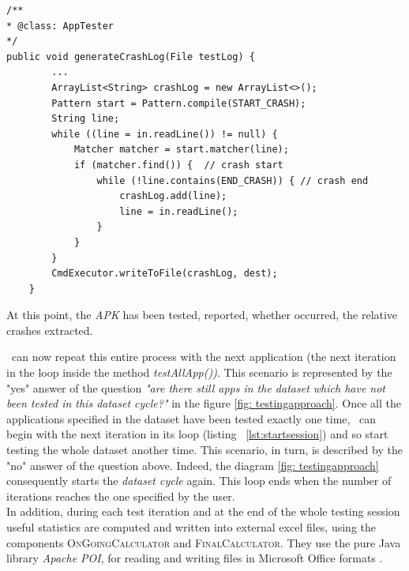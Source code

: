 \begin{lstlisting}[caption=\AppTester's method for extracting a crash log from its test log,label={lst:generatecrash}]
/**
* @class: AppTester
*/
public void generateCrashLog(File testLog) {
        ...
        ArrayList<String> crashLog = new ArrayList<>();
        Pattern start = Pattern.compile(START_CRASH);
        String line;
        while ((line = in.readLine()) != null) {
            Matcher matcher = start.matcher(line);
            if (matcher.find()) {  // crash start
                while (!line.contains(END_CRASH)) { // crash end
                    crashLog.add(line);
                    line = in.readLine();
                }
            }
        }
        CmdExecutor.writeToFile(crashLog, dest);
    }
\end{lstlisting} 
At this point, the \textit{APK} has been tested, reported, whether occurred, the relative crashes extracted.



\toolname\ can now repeat this entire process with the next application (\ie the next iteration in the loop inside the method \textit{testAllApp())}. This scenario is represented by the "yes" answer of the question \textit{"are there still apps in the dataset which have not been tested in this dataset cycle?"} in the figure \ref{fig: testingapproach}.
Once all the applications specified in the dataset have been tested exactly one time, \SessionLauncher\ can begin with the next iteration in its loop (listing ~\ref{lst:startsession}) and so start testing the whole dataset another time. 
This scenario, in turn, is described by the "no" answer of the question above. Indeed, the diagram \ref{fig: testingapproach} consequently starts the \textit{dataset cycle} again. 
This loop ends when the number of iterations reaches the one specified by the user. \\
In addition, during each test iteration and at the end of the whole testing session useful statistics are computed and written into external excel files, using the components \textsc{OnGoingCalculator} and \textsc{FinalCalculator}. They use the pure Java library \textit{Apache POI}, for reading and writing files in Microsoft Office formats \cite{apachepoi}. 




